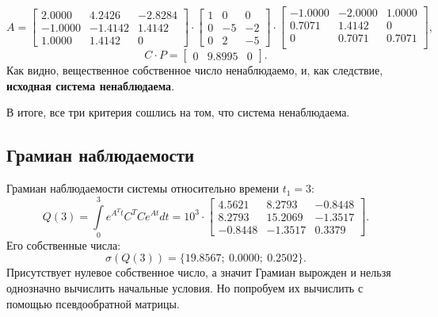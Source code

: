 \begin{equation*}
    A = \begin{bmatrix}
        2.0000&    4.2426   &-2.8284\\
        -1.0000&   -1.4142 &   1.4142\\
         1.0000 &   1.4142&         0
    \end{bmatrix}\cdot
    \begin{bmatrix}
        1&     0  &   0\\
        0 &   -5 &   -2\\
        0  &   2&    -5
    \end{bmatrix}\cdot
    \begin{bmatrix}
        -1.0000&   -2.0000 &   1.0000\\
        0.7071  &  1.4142 &        0\\
             0   & 0.7071&    0.7071\\
    \end{bmatrix},
\end{equation*}
\begin{equation*}
    C\cdot P=\begin{bmatrix}
        0 & 9.8995 & 0
    \end{bmatrix}.
\end{equation*}
Как видно, вещественное собственное число ненаблюдаемо, и, как следствие,
\textbf{исходная система ненаблюдаема}.

В итоге, все три критерия сошлись на том, что система ненаблюдаема.

\subsection{Грамиан наблюдаемости}

Грамиан наблюдаемости системы относительно времени $t_1 = 3$:
\begin{equation*}
    Q(3)=\int\limits_{0}^{3}e^{A^Tt}C^TCe^{At}dt=10^3\cdot\begin{bmatrix}
        4.5621&    8.2793  & -0.8448\\
        8.2793 &  15.2069 &  -1.3517\\
       -0.8448  & -1.3517&    0.3379
    \end{bmatrix}.
\end{equation*}
Его собственные числа:
\begin{equation*}
    \sigma(Q(3))=\{19.8567;\ 0.0000;\ 0.2502\}.
\end{equation*}
Присутствует нулевое собственное число, а значит Грамиан вырожден и
нельзя однозначно вычислить начальные условия. Но попробуем их
вычислить с помощью псевдообратной матрицы.

